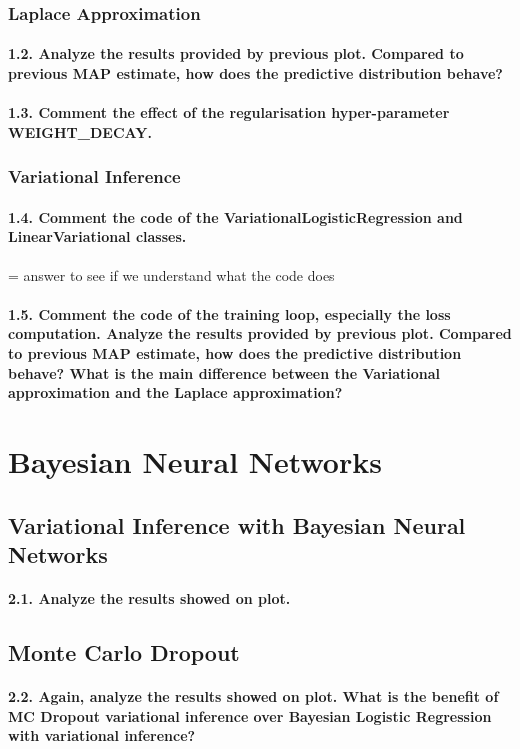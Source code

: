 \subsubsection{Laplace Approximation}
\paragraph{1.2. Analyze the results provided by previous plot. Compared to previous MAP estimate, how does the predictive distribution behave?}

\paragraph{1.3. Comment the effect of the regularisation hyper-parameter WEIGHT\_DECAY.}

\subsubsection{Variational Inference}
\paragraph{1.4. Comment the code of the VariationalLogisticRegression and LinearVariational classes.}
= answer to see if we understand what the code does

\paragraph{1.5. Comment the code of the training loop, especially the loss computation. Analyze the results provided by previous plot. Compared to previous MAP estimate, how does the predictive distribution behave? What is the main difference between the Variational approximation and the Laplace approximation?}

\section{Bayesian Neural Networks}
\subsection{Variational Inference with Bayesian Neural Networks}
\paragraph{2.1. Analyze the results showed on plot.}

\subsection{Monte Carlo Dropout}
\paragraph{2.2. Again, analyze the results showed on plot. What is the benefit of MC Dropout variational inference over Bayesian Logistic Regression with variational inference?}